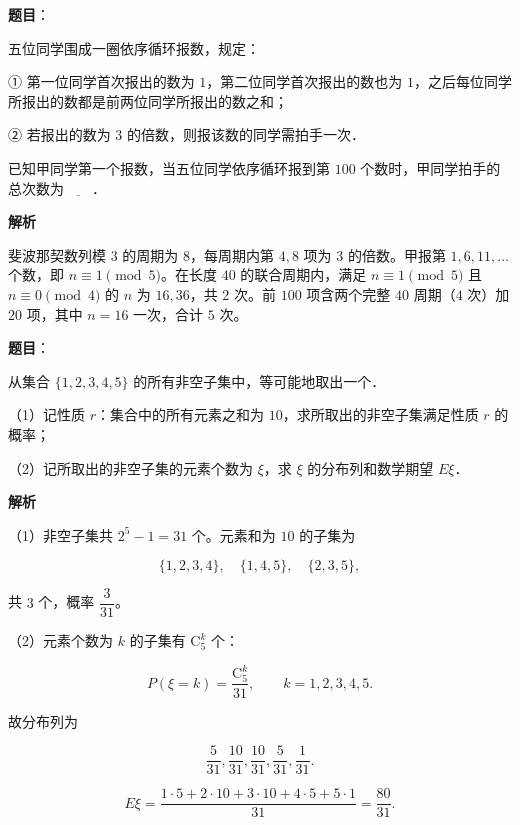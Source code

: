 \begin{answer}

\textbf{题目}：

五位同学围成一圈依序循环报数，规定：

① 第一位同学首次报出的数为 $1$，第二位同学首次报出的数也为 $1$，之后每位同学所报出的数都是前两位同学所报出的数之和；

② 若报出的数为 $3$ 的倍数，则报该数的同学需拍手一次．

已知甲同学第一个报数，当五位同学依序循环报到第 $100$ 个数时，甲同学拍手的总次数为$\underline{\qquad}$．

\textbf{解析}

斐波那契数列模 $3$ 的周期为 $8$，每周期内第 $4,8$ 项为 $3$ 的倍数。甲报第 $1,6,11,\ldots$ 个数，即 $n\equiv1\pmod5$。在长度 $40$ 的联合周期内，满足 $n\equiv1\pmod5$ 且 $n\equiv0\pmod4$ 的 $n$ 为 $16,36$，共 $2$ 次。前 $100$ 项含两个完整 $40$ 周期（$4$ 次）加 $20$ 项，其中 $n=16$ 一次，合计 $5$ 次。


\end{answer}
\begin{answer}

\textbf{题目}：

从集合 $\{1,2,3,4,5\}$ 的所有非空子集中，等可能地取出一个．

（1）记性质 $r$：集合中的所有元素之和为 $10$，求所取出的非空子集满足性质 $r$ 的概率；

（2）记所取出的非空子集的元素个数为 $\xi$，求 $\xi$ 的分布列和数学期望 $E\xi$．

\textbf{解析}

（1）非空子集共 $2^5-1=31$ 个。元素和为 $10$ 的子集为

\nopagebreak[4]
\[\{1,2,3,4\},\quad\{1,4,5\},\quad\{2,3,5\},\]

共 $3$ 个，概率 $\dfrac3{31}$。

（2）元素个数为 $k$ 的子集有 $\mathrm C_5^k$ 个：

\nopagebreak[4]
\[P(\xi=k)=\frac{\mathrm C_5^k}{31},\qquad k=1,2,3,4,5.\]

故分布列为

\nopagebreak[4]
\[\frac5{31},\frac{10}{31},\frac{10}{31},\frac5{31},\frac1{31}.\]

\nopagebreak[4]
\[E\xi=\frac{1\cdot5+2\cdot10+3\cdot10+4\cdot5+5\cdot1}{31}
=\frac{80}{31}.\]


\end{answer}
